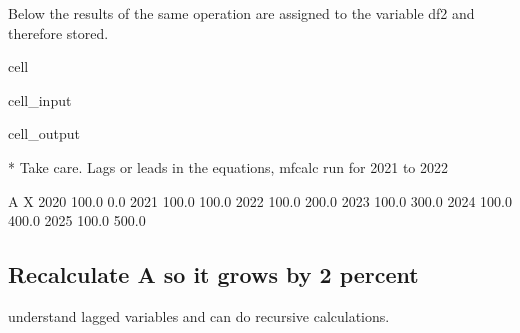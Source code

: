 \documentclass[letterpaper,10pt,english]{jupyterBook}
\begin{document}
\sphinxAtStartPar
Below the results of the same operation are assigned to the variable df2 and therefore stored.

\begin{sphinxuseclass}{cell}\begin{sphinxVerbatimInput}

\begin{sphinxuseclass}{cell_input}
\begin{sphinxVerbatim}[commandchars=\\\{\}]
 
\end{sphinxVerbatim}

\end{sphinxuseclass}\end{sphinxVerbatimInput}
\begin{sphinxVerbatimOutput}

\begin{sphinxuseclass}{cell_output}
\begin{sphinxVerbatim}[commandchars=\\\{\}]
* Take care. Lags or leads in the equations, mfcalc run for 2021 to 2022
\end{sphinxVerbatim}

\begin{sphinxVerbatim}[commandchars=\\\{\}]
          A      X
2020  100.0    0.0
2021  100.0  100.0
2022  100.0  200.0
2023  100.0  300.0
2024  100.0  400.0
2025  100.0  500.0
\end{sphinxVerbatim}

\end{sphinxuseclass}\end{sphinxVerbatimOutput}

\end{sphinxuseclass}

\subsection{Recalculate A so  it grows by 2 percent}
\label{\detokenize{content/04_PythonEssentials/mfcalc:recalculate-a-so-it-grows-by-2-percent}}
\sphinxAtStartPar
{} understand lagged variables and can do recursive calculations.
\end{document}
